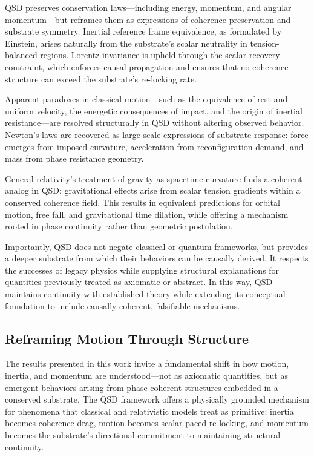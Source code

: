 \documentclass[entropy,article,submit,pdftex,moreauthors]{Definitions/mdpi}
\begin{document}
QSD preserves conservation laws—including energy, momentum, and angular momentum—but reframes them as expressions of coherence preservation and substrate symmetry. Inertial reference frame equivalence, as formulated by Einstein, arises naturally from the substrate’s scalar neutrality in tension-balanced regions. Lorentz invariance is upheld through the scalar recovery constraint, which enforces causal propagation and ensures that no coherence structure can exceed the substrate’s re-locking rate.

Apparent paradoxes in classical motion—such as the equivalence of rest and uniform velocity, the energetic consequences of impact, and the origin of inertial resistance—are resolved structurally in QSD without altering observed behavior. Newton’s laws are recovered as large-scale expressions of substrate response: force emerges from imposed curvature, acceleration from reconfiguration demand, and mass from phase resistance geometry.

General relativity’s treatment of gravity as spacetime curvature finds a coherent analog in QSD: gravitational effects arise from scalar tension gradients within a conserved coherence field. This results in equivalent predictions for orbital motion, free fall, and gravitational time dilation, while offering a mechanism rooted in phase continuity rather than geometric postulation.

Importantly, QSD does not negate classical or quantum frameworks, but provides a deeper substrate from which their behaviors can be causally derived. It respects the successes of legacy physics while supplying structural explanations for quantities previously treated as axiomatic or abstract. In this way, QSD maintains continuity with established theory while extending its conceptual foundation to include causally coherent, falsifiable mechanisms.

\subsection{Reframing Motion Through Structure}

The results presented in this work invite a fundamental shift in how motion, inertia, and momentum are understood—not as axiomatic quantities, but as emergent behaviors arising from phase-coherent structures embedded in a conserved substrate. The QSD framework offers a physically grounded mechanism for phenomena that classical and relativistic models treat as primitive: inertia becomes coherence drag, motion becomes scalar-paced re-locking, and momentum becomes the substrate’s directional commitment to maintaining structural continuity.
\end{document}
